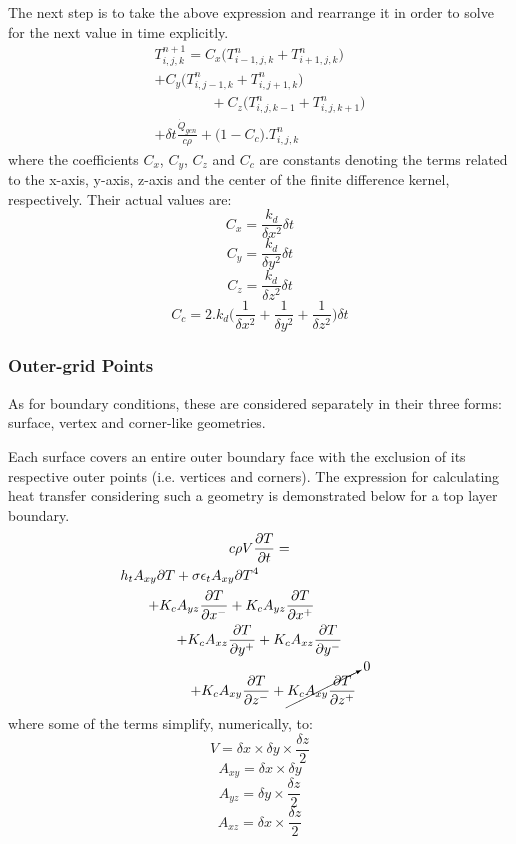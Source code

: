 \documentclass[a4paper,10pt]{IEEEtran}
\begin{document}
	The next step is to take the above expression and rearrange it in order to solve for the next value in time explicitly.
		\begin{multline}
		T_{i,j,k}^{n+1} = C_x\Big( T_{i-1,j,k}^n+T_{i+1,j,k}^n \Big)\\ 
		+ C_y \Big( T_{i,j-1,k}^n+T_{i,j+1,k}^n \Big)  \\
		\qquad \qquad + C_z \Big( T_{i,j,k-1}^n+T_{i,j,k+1}^n \Big)\\ 
		+ \delta t\frac{\dot{Q}_{gen}}{c\rho} + \Big( 1 - C_c \Big).T_{i,j,k}^n 
		\end{multline}
	where the coefficients $C_x$, $C_y$, $C_z$ and $C_c$ are constants denoting the terms related to the x-axis, y-axis, z-axis and the center of the finite difference kernel, respectively. Their actual values are:
	$$C_x = \frac{k_d}{\delta x^2} \delta t$$
	$$C_y =  \frac{k_d}{\delta y^2} \delta t$$
	$$C_z = \frac{k_d}{\delta z^2} \delta t$$
	$$C_c = 2.k_d\Big( \frac{1}{\delta x^2}+\frac{1}{\delta y^2}+\frac{1}{\delta z^2} \Big)\delta t$$
		
	
	
	\subsubsection{Outer-grid Points}
	As for boundary conditions, these are considered separately in their three forms: surface, vertex and corner-like geometries.
	
	Each surface covers an entire outer boundary face with the exclusion of its respective outer points (i.e. vertices and corners). The expression for calculating heat transfer considering such a geometry is demonstrated below for a top layer boundary.
	\begin{multline}
	c\rho V \frac{\partial T}{\partial t} = \\
	h_t A_{xy} \partial T + \sigma \epsilon_t A_{xy} \partial T^4 \qquad \qquad \qquad \qquad \qquad \\
	+ K_c A_{yz}\frac{\partial T}{\partial x^-} + K_c A_{yz}\frac{\partial T}{\partial x^+} \qquad \qquad \\
	+ K_c A_{xz}\frac{\partial T}{\partial y^+} + K_c A_{xz}\frac{\partial T}{\partial y^-} \\
	\qquad + K_c A_{xy} \frac{\partial T}{\partial z^-} + \cancelto{0}{K_c A_{xy} \frac{\partial T}{\partial z^+}}
	\end{multline}
	where some of the terms simplify, numerically, to:
	$$V = \delta x \times \delta y \times \frac{\delta z}{2} $$
	$$A_{xy} = \delta x \times \delta y $$
	$$A_{yz} = \delta y \times \frac{\delta z}{2} $$
	$$A_{xz} = \delta x \times \frac{\delta z}{2} $$
	
\end{document}
